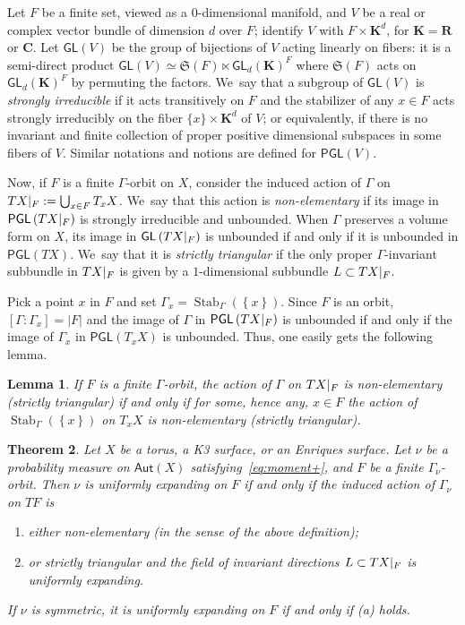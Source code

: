 \documentclass[JEP,XML,SOM,Unicode,published]{cedram}
\newenvironment{enumeratea}
{\bgroup\def\theenumi{\alph{enumi}}\begin{enumerate}}
{\end{enumerate}\egroup}
\newcommand{\set}[1]{\left\{#1\right\}}
\newcommand{\abs}[1]{\left\vert#1\right\vert}
\newcommand{\rest}[1]{ \arrowvert_{#1}}
\newcommand{\lrpar}[1]{\left(#1\right)}
\DeclareMathOperator{\Stab}{Stab}
\def\C{\mathbf{C}}
\def\R{\mathbf{R}}
\newcommand\Aut{\mathsf{Aut}}
\newcommand\PGL{{\mathsf{PGL}}}
\newcommand\GL{{\mathsf{GL}}}
\theoremstyle{plain}
\newtheorem{thm}{Theorem}[section]
\newtheorem{lem}[thm]{Lemma}
\theoremstyle{definition}
\begin{document}
Let $F$ be a finite set, viewed as a $0$-dimensional manifold, and $V$ be a real or complex vector bundle of dimension $d$ over $F$; identify
$V$ with $ F\times \mathbf{K}^d$, for ${\mathbf{K}} = \R$ or $\C$. Let $\GL(V)$ be the group of bijections of $V$ acting linearly on fibers: it is a semi-direct product $\GL(V) \simeq \mathfrak{S}(F) \ltimes \GL_d({\mathbf{K}})^F$ where $\mathfrak{S}(F)$ acts on
$\GL_d({\mathbf{K}})^F$ by permuting the factors. We~say that a subgroup of $\GL(V)$ is \emph{strongly irreducible} if it acts transitively on $F$
and the stabilizer of any $x\in F$ acts strongly irreducibly on the fiber $\{ x\} \times {\mathbf{K}}^d$ of $V$; or equivalently, if there is no invariant and finite collection of proper positive dimensional subspaces in some fibers of $V$. Similar notations and notions are defined for $\PGL(V)$.

Now, if $F$ is a finite $\Gamma$-orbit on $X$,
consider the induced action of $\Gamma$ on $TX\rest{F}:=\bigcup_{x\in F} T_x X$. We~say that this action is \emph{non-elementary}
if its image in $\PGL\lrpar{TX\rest{F}}$ is strongly irreducible and unbounded. When
$\Gamma$ preserves a volume form on $X$, its image in $\GL\lrpar{TX\rest{F}}$ is unbounded if and only if it is unbounded in $\PGL\lrpar{TX}$. We~say that it is \emph{strictly triangular} if the only proper $\Gamma$-invariant subbundle in $T X\rest{F}$ is given by a $1$-dimensional subbundle $L\subset TX\rest{F}$.

Pick a point $x$ in $F$ and set $\Gamma_x = \Stab_{\Gamma}(\set{x})$. Since $F$ is an orbit, $[\Gamma:\Gamma_x]=\abs{F}$ and the image of $\Gamma$ in $\PGL\lrpar{TX\rest{F}}$ is unbounded if and only if the image of $\Gamma_x$ in $\PGL\lrpar{T_xX}$ is unbounded. Thus, one easily gets the following lemma.

\begin{lem}\label{lem:stab_NE}
If $F$ is a finite $\Gamma$-orbit, the action of
$\Gamma$ on $TX\rest{F}$ is non-elementary (\resp strictly triangular) if and only if for some, hence any, $x\in F$
the action of $\Stab_{\Gamma}(\set{x})$ on $T_{x}X$ is non-elementary (\resp strictly triangular).
\end{lem}

\begin{thm}\label{thm:finite_UE}
Let $X$ be a torus, a K3 surface, or an Enriques surface. Let
$\nu$ be a probability measure on $\Aut(X)$ satisfying~\eqref{eq:moment+}, and $F$ be a finite $\Gamma_\nu$-orbit.
Then $\nu$ is uniformly expanding on $F$ if and only if the
induced action of $\Gamma_\nu$ on $TF$ is
\begin{enumeratea}
\item\label{thm:finite_UEa} either non-elementary (in the sense of the above definition);
\item\label{thm:finite_UEb} or strictly triangular and the field of invariant directions $L\subset TX\rest{F}$ is uniformly expanding.
\end{enumeratea}
If $\nu$ is symmetric, it is uniformly expanding on $F$ if and only if (a) holds.
\end{thm}
\end{document}

